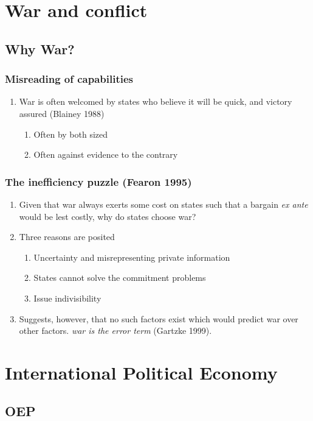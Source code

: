 \documentclass[11pt]{article}
\begin{document}
\section{War and conflict}
\label{sec-2}
\subsection{Why War?}
\label{sec-2-1}
\subsubsection{Misreading of capabilities}
\label{sec-2-1-1}
\begin{enumerate}
\item War is often welcomed by states who believe it will be quick, and
victory assured (Blainey 1988)
\begin{enumerate}
\item Often by both sized
\item Often against evidence to the contrary
\end{enumerate}
\end{enumerate}
\subsubsection{The inefficiency puzzle (Fearon 1995)}
\label{sec-2-1-2}
\begin{enumerate}
\item Given that war always exerts some cost on states such that a bargain \emph{ex ante}
   would be lest costly, why do states choose war?
\item Three reasons are posited
\begin{enumerate}
\item Uncertainty and misrepresenting private information
\item States cannot solve the commitment problems
\item Issue indivisibility
\end{enumerate}
\item Suggests, however, that no such factors exist which would predict
war over other factors. \emph{war is the error term} (Gartzke 1999).
\end{enumerate}
\section{International Political Economy}
\label{sec-3}
\subsection{OEP}
\label{sec-3-1}
\end{document}
